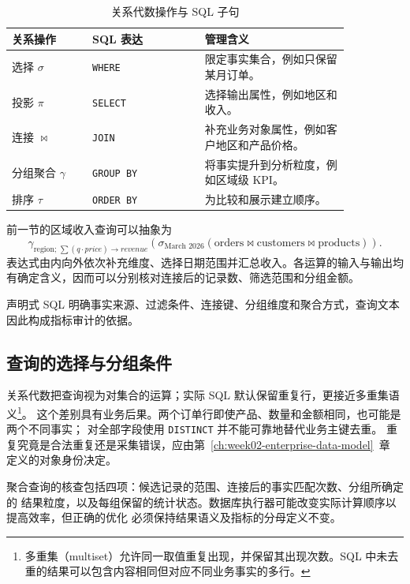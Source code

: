 \begin{table}[htbp]
\centering
\caption{关系代数操作与 SQL 子句}
\begin{tabular}{P{0.20\linewidth}P{0.29\linewidth}P{0.36\linewidth}}
\toprule
{}
关系操作 & SQL 表达 & 管理含义\\
\midrule
选择 \(\sigma\) & \texttt{WHERE} & 限定事实集合，例如只保留某月订单。\\
投影 \(\pi\) & \texttt{SELECT} & 选择输出属性，例如地区和收入。\\
连接 \(\Join\) & \texttt{JOIN} & 补充业务对象属性，例如客户地区和产品价格。\\
分组聚合 \(\gamma\) & \texttt{GROUP BY} & 将事实提升到分析粒度，例如区域级 KPI。\\
排序 \(\tau\) & \texttt{ORDER BY} & 为比较和展示建立顺序。\\
\bottomrule
\end{tabular}
\end{table}

前一节的区域收入查询可以抽象为
\[
\gamma_{\text{region};\, \sum(q\cdot price)\rightarrow revenue}
\left(
\sigma_{\text{March 2026}}
(\text{orders}\Join \text{customers}\Join \text{products})
\right).
\]
表达式由内向外依次补充维度、选择日期范围并汇总收入。各运算的输入与输出均有确定含义，因而可以分别核对连接后的记录数、筛选范围和分组金额。

\begin{convention}[声明式查询与可审计性]
声明式 SQL 明确事实来源、过滤条件、连接键、分组维度和聚合方式，查询文本因此构成指标审计的依据。
\end{convention}

\subsection{查询的选择与分组条件}
关系代数把查询视为对集合的运算；实际 SQL 默认保留重复行，更接近多重集语义\footnote{多重集（multiset）允许同一取值重复出现，并保留其出现次数。SQL 中未去重的结果可以包含内容相同但对应不同业务事实的多行。}。
这个差别具有业务后果。两个订单行即使产品、数量和金额相同，也可能是两个不同事实；
对全部字段使用 \texttt{DISTINCT} 并不能可靠地替代业务主键去重。
重复究竟是合法重复还是采集错误，应由第~\ref{ch:week02-enterprise-data-model}~章
定义的对象身份决定。

聚合查询的核查包括四项：候选记录的范围、连接后的事实匹配次数、分组所确定的
结果粒度，以及每组保留的统计状态。数据库执行器可能改变实际计算顺序以提高效率，但正确的优化
必须保持结果语义及指标的分母定义不变。

